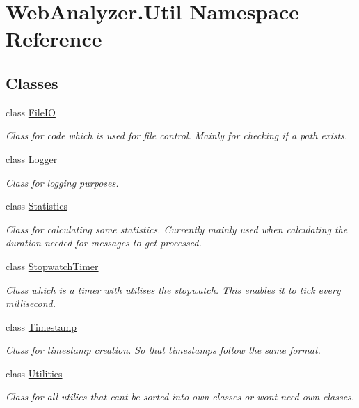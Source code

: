 \hypertarget{namespace_web_analyzer_1_1_util}{}\section{Web\+Analyzer.\+Util Namespace Reference}
\label{namespace_web_analyzer_1_1_util}
\subsection*{Classes}
\begin{DoxyCompactItemize}
\item 
class \hyperlink{class_web_analyzer_1_1_util_1_1_file_i_o}{File\+I\+O}
\begin{DoxyCompactList}\small\item\em Class for code which is used for file control. Mainly for checking if a path exists. \end{DoxyCompactList}\item 
class \hyperlink{class_web_analyzer_1_1_util_1_1_logger}{Logger}
\begin{DoxyCompactList}\small\item\em Class for logging purposes. \end{DoxyCompactList}\item 
class \hyperlink{class_web_analyzer_1_1_util_1_1_statistics}{Statistics}
\begin{DoxyCompactList}\small\item\em Class for calculating some statistics. Currently mainly used when calculating the duration needed for messages to get processed. \end{DoxyCompactList}\item 
class \hyperlink{class_web_analyzer_1_1_util_1_1_stopwatch_timer}{Stopwatch\+Timer}
\begin{DoxyCompactList}\small\item\em Class which is a timer with utilises the stopwatch. This enables it to tick every millisecond. \end{DoxyCompactList}\item 
class \hyperlink{class_web_analyzer_1_1_util_1_1_timestamp}{Timestamp}
\begin{DoxyCompactList}\small\item\em Class for timestamp creation. So that timestamps follow the same format. \end{DoxyCompactList}\item 
class \hyperlink{class_web_analyzer_1_1_util_1_1_utilities}{Utilities}
\begin{DoxyCompactList}\small\item\em Class for all utilies that can\textquotesingle{}t be sorted into own classes or won\textquotesingle{}t need own classes. \end{DoxyCompactList}\end{DoxyCompactItemize}
